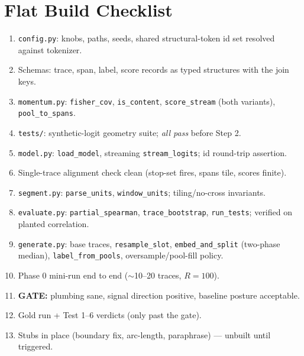 \documentclass[11pt]{article}
\newcommand{\modu}[1]{\texttt{#1}}
\newcommand{\fn}[1]{\texttt{#1}}
\begin{document}
\section{Flat Build Checklist}
\label{sec:checklist}

\begin{enumerate}[leftmargin=2em]
  \item[$\square$] \modu{config.py}: knobs, paths, seeds, shared structural-token id set resolved against tokenizer.
  \item[$\square$] Schemas: trace, span, label, score records as typed structures with the join keys.
  \item[$\square$] \modu{momentum.py}: \fn{fisher\_cov}, \fn{is\_content}, \fn{score\_stream} (both variants), \fn{pool\_to\_spans}.
  \item[$\square$] \modu{tests/}: synthetic-logit geometry suite; \emph{all pass} before Step 2.
  \item[$\square$] \modu{model.py}: \fn{load\_model}, streaming \fn{stream\_logits}; id round-trip assertion.
  \item[$\square$] Single-trace alignment check clean (stop-set fires, spans tile, scores finite).
  \item[$\square$] \modu{segment.py}: \fn{parse\_units}, \fn{window\_units}; tiling/no-cross invariants.
  \item[$\square$] \modu{evaluate.py}: \fn{partial\_spearman}, \fn{trace\_bootstrap}, \fn{run\_tests}; verified on planted correlation.
  \item[$\square$] \modu{generate.py}: base traces, \fn{resample\_slot}, \fn{embed\_and\_split} (two-phase median), \fn{label\_from\_pools}, oversample/pool-fill policy.
  \item[$\square$] Phase 0 mini-run end to end ($\sim$10--20 traces, $R=100$).
  \item[$\square$] \textbf{GATE:} plumbing sane, signal direction positive, baseline posture acceptable.
  \item[$\square$] Gold run + Test 1--6 verdicts (only past the gate).
  \item[$\square$] Stubs in place (boundary fix, arc-length, paraphrase) --- unbuilt until triggered.
\end{enumerate}
\end{document}
